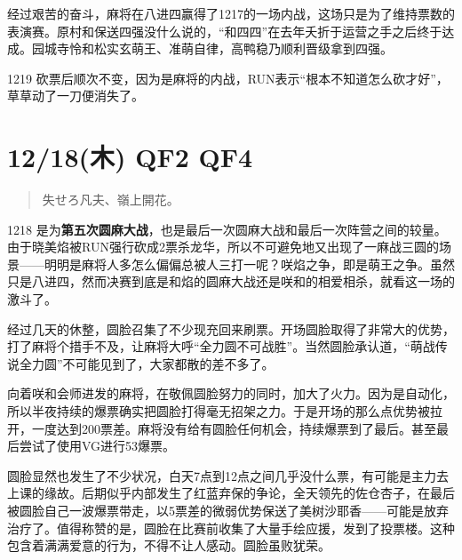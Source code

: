 经过艰苦的奋斗，麻将在八进四赢得了1217的一场内战，这场只是为了维持票数的表演赛。原村和保送四强没什么说的，“和四四”在去年夭折于运营之手之后终于达成。园城寺怜和松实玄萌王、准萌自律，高鸭稳乃顺利晋级拿到四强。

1219 砍票后顺次不变，因为是麻将的内战，RUN表示“根本不知道怎么砍才好”，草草动了一刀便消失了。

\section{12/18(木) QF2 QF4}

\begin{quote}\ttfamily
失せろ凡夫、嶺上開花。
\end{quote}



1218 是为\textbf{第五次圆麻大战}，也是最后一次圆麻大战和最后一次阵营之间的较量。由于晓美焰被RUN强行砍成2票杀龙华，所以不可避免地又出现了一麻战三圆的场景——明明是麻将人多怎么偏偏总被人三打一呢？咲焰之争，即是萌王之争。虽然只是八进四，然而决赛到底是和焰的圆麻大战还是咲和的相爱相杀，就看这一场的激斗了。

经过几天的休整，圆脸召集了不少现充回来刷票。开场圆脸取得了非常大的优势，打了麻将个措手不及，让麻将大呼“全力圆不可战胜”。当然圆脸承认道，“萌战传说全力圆”不可能见到了，大家都散的差不多了。

向着咲和会师进发的麻将，在敬佩圆脸努力的同时，加大了火力。因为是自动化，所以半夜持续的爆票确实把圆脸打得毫无招架之力。于是开场的那么点优势被拉开，一度达到200票差。麻将没有给有圆脸任何机会，持续爆票到了最后。甚至最后尝试了使用VG进行53爆票。

圆脸显然也发生了不少状况，白天7点到12点之间几乎没什么票，有可能是主力去上课的缘故。后期似乎内部发生了红蓝弃保的争论，全天领先的佐仓杏子，在最后被圆脸自己一波爆票带走，以5票差的微弱优势保送了美树沙耶香——可能是放弃治疗了。值得称赞的是，圆脸在比赛前收集了大量手绘应援，发到了投票楼。这种包含着满满爱意的行为，不得不让人感动。圆脸虽败犹荣。

